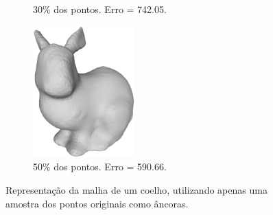 \begin{figure}[H]
\begin{subfigure}[b]{0.47\textwidth}
		\caption{30\% dos pontos. Erro = 742.05.}
		\label{fig:ex43}
	\end{subfigure}
	\hfill
	\begin{subfigure}[b]{0.47\textwidth}
		\centering
		\includegraphics[width=0.43\textwidth]{img/res/bunny_50.eps}
		\caption{50\% dos pontos. Erro = 590.66.}
		\label{fig:ex44}
	\end{subfigure}
	\caption{Representação da malha de um coelho, utilizando apenas uma amostra dos pontos originais como âncoras.}
	\label{fig:ex4rep}
\end{figure}